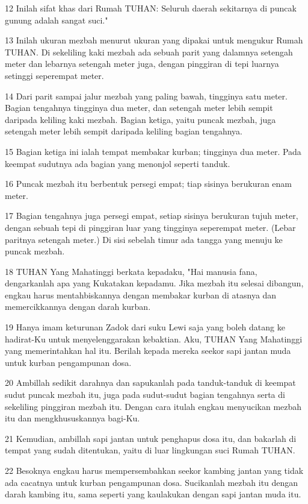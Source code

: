 \par 12 Inilah sifat khas dari Rumah TUHAN: Seluruh daerah sekitarnya di puncak gunung adalah sangat suci."
\par 13 Inilah ukuran mezbah menurut ukuran yang dipakai untuk mengukur Rumah TUHAN. Di sekeliling kaki mezbah ada sebuah parit yang dalamnya setengah meter dan lebarnya setengah meter juga, dengan pinggiran di tepi luarnya setinggi seperempat meter.
\par 14 Dari parit sampai jalur mezbah yang paling bawah, tingginya satu meter. Bagian tengahnya tingginya dua meter, dan setengah meter lebih sempit daripada keliling kaki mezbah. Bagian ketiga, yaitu puncak mezbah, juga setengah meter lebih sempit daripada keliling bagian tengahnya.
\par 15 Bagian ketiga ini ialah tempat membakar kurban; tingginya dua meter. Pada keempat sudutnya ada bagian yang menonjol seperti tanduk.
\par 16 Puncak mezbah itu berbentuk persegi empat; tiap sisinya berukuran enam meter.
\par 17 Bagian tengahnya juga persegi empat, setiap sisinya berukuran tujuh meter, dengan sebuah tepi di pinggiran luar yang tingginya seperempat meter. (Lebar paritnya setengah meter.) Di sisi sebelah timur ada tangga yang menuju ke puncak mezbah.
\par 18 TUHAN Yang Mahatinggi berkata kepadaku, "Hai manusia fana, dengarkanlah apa yang Kukatakan kepadamu. Jika mezbah itu selesai dibangun, engkau harus mentahbiskannya dengan membakar kurban di atasnya dan memercikkannya dengan darah kurban.
\par 19 Hanya imam keturunan Zadok dari suku Lewi saja yang boleh datang ke hadirat-Ku untuk menyelenggarakan kebaktian. Aku, TUHAN Yang Mahatinggi yang memerintahkan hal itu. Berilah kepada mereka seekor sapi jantan muda untuk kurban pengampunan dosa.
\par 20 Ambillah sedikit darahnya dan sapukanlah pada tanduk-tanduk di keempat sudut puncak mezbah itu, juga pada sudut-sudut bagian tengahnya serta di sekeliling pinggiran mezbah itu. Dengan cara itulah engkau menyucikan mezbah itu dan mengkhususkannya bagi-Ku.
\par 21 Kemudian, ambillah sapi jantan untuk penghapus dosa itu, dan bakarlah di tempat yang sudah ditentukan, yaitu di luar lingkungan suci Rumah TUHAN.
\par 22 Besoknya engkau harus mempersembahkan seekor kambing jantan yang tidak ada cacatnya untuk kurban pengampunan dosa. Sucikanlah mezbah itu dengan darah kambing itu, sama seperti yang kaulakukan dengan sapi jantan muda itu.
